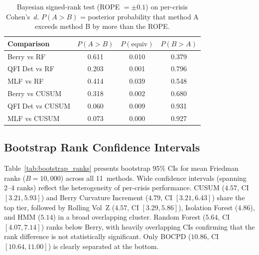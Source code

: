 \documentclass[3p]{elsarticle}
\begin{document}
\begin{table}[htbp]
\centering
\caption{Bayesian signed-rank test (ROPE $= \pm 0.1$) on per-crisis
  Cohen's~$d$.  $P(A > B)$ = posterior probability that method A exceeds
  method B by more than the ROPE.}
\label{tab:bayesian}
\small
\begin{tabular}{lccc}
\toprule
Comparison & $P(A > B)$ & $P(\text{equiv})$ & $P(B > A)$ \\
\midrule
Berry vs RF   & 0.611 & 0.010 & 0.379 \\
QFI Det vs RF & 0.203 & 0.001 & 0.796 \\
MLF vs RF     & 0.414 & 0.039 & 0.548 \\
Berry vs CUSUM  & 0.318 & 0.002 & 0.680 \\
QFI Det vs CUSUM & 0.060 & 0.009 & 0.931 \\
MLF vs CUSUM    & 0.073 & 0.000 & 0.927 \\
\bottomrule
\end{tabular}
\end{table}

\subsection{Bootstrap Rank Confidence Intervals}

Table~\ref{tab:bootstrap_ranks} presents bootstrap 95\% CIs for mean
Friedman ranks ($B = 10{,}000$) across all 11~methods.  Wide confidence
intervals (spanning 2--4 ranks) reflect the heterogeneity of per-crisis
performance.  CUSUM ($4.57$, CI $[3.21, 5.93]$) and Berry Curvature
Increment ($4.79$, CI $[3.21, 6.43]$) share the top tier, followed by
Rolling Vol~Z ($4.57$, CI $[3.29, 5.86]$), Isolation Forest ($4.86$),
and HMM ($5.14$) in a broad overlapping cluster.  Random Forest
($5.64$, CI $[4.07, 7.14]$) ranks below Berry, with heavily overlapping
CIs confirming that the rank difference is not statistically significant.
Only BOCPD ($10.86$, CI $[10.64, 11.00]$) is clearly separated at
the bottom.
\end{document}
